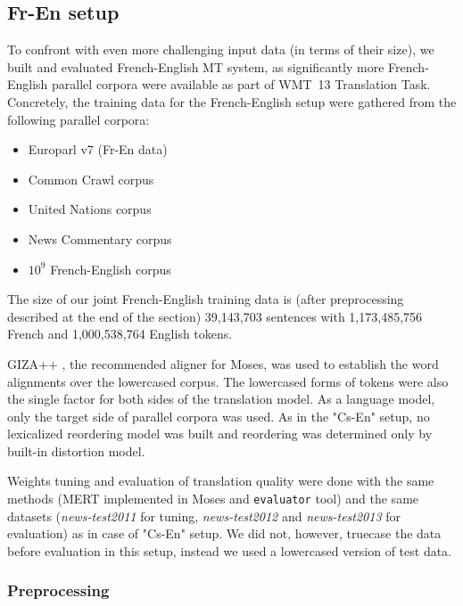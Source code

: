 \subsection{Fr-En setup}

To confront \eppex{} with even more challenging input data (in terms of their size),
we built and evaluated French-English MT system, as significantly more French-English parallel
corpora were available as part of WMT~13 Translation Task. Concretely, the training data for
the French-English setup were gathered from the following parallel corpora:
\begin{itemize}
  \item Europarl v7 (Fr-En data)
  \item Common Crawl corpus
  \item United Nations corpus
  \item News Commentary corpus
  \item $10^9$ French-English corpus
\end{itemize}
The size of our joint French-English training data is (after preprocessing described
at the end of the section) 39,143,703 sentences with 1,173,485,756 French and 1,000,538,764
English tokens.

GIZA++ \citep{och:giza}, the recommended aligner for Moses,
was used to establish the word alignments over the lowercased corpus.
The lowercased forms of tokens were also the single factor for both sides of
the translation model.
As a language model, only the target side of parallel corpora was used.
As in the "Cs-En" setup, no lexicalized reordering model was built and reordering was
determined only by built-in distortion model.

Weights tuning and evaluation of translation quality were done with the same methods
(MERT implemented in Moses and \texttt{evaluator} tool) and the same datasets
(\emph{news-test2011} for tuning, \emph{news-test2012} and \emph{news-test2013} for
evaluation) as in case of "Cs-En" setup. We did not, however, truecase the data before
evaluation in this setup, instead we used a lowercased version of test data.

\subsubsection*{Preprocessing}

